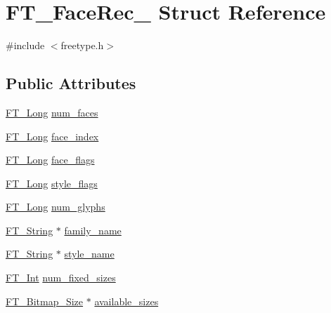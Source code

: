 \hypertarget{struct_f_t___face_rec__}{}\section{F\+T\+\_\+\+Face\+Rec\+\_\+ Struct Reference}
\label{struct_f_t___face_rec__}


{\ttfamily \#include $<$freetype.\+h$>$}

\subsection*{Public Attributes}
\begin{DoxyCompactItemize}
\item 
\mbox{\hyperlink{fttypes_8h_a7fa72a1f0e79fb1860c5965789024d6f}{F\+T\+\_\+\+Long}} \mbox{\hyperlink{struct_f_t___face_rec___af28be4cba102baaeb09d8e24b71e88fe}{num\+\_\+faces}}
\item 
\mbox{\hyperlink{fttypes_8h_a7fa72a1f0e79fb1860c5965789024d6f}{F\+T\+\_\+\+Long}} \mbox{\hyperlink{struct_f_t___face_rec___ab9a5640eb25bd3c743b3d725edd68a87}{face\+\_\+index}}
\item 
\mbox{\hyperlink{fttypes_8h_a7fa72a1f0e79fb1860c5965789024d6f}{F\+T\+\_\+\+Long}} \mbox{\hyperlink{struct_f_t___face_rec___af1596857ebc9f8eac4c4b51c8f3ffd31}{face\+\_\+flags}}
\item 
\mbox{\hyperlink{fttypes_8h_a7fa72a1f0e79fb1860c5965789024d6f}{F\+T\+\_\+\+Long}} \mbox{\hyperlink{struct_f_t___face_rec___ab06fc56f19fc1bf51cbed9bd621d3835}{style\+\_\+flags}}
\item 
\mbox{\hyperlink{fttypes_8h_a7fa72a1f0e79fb1860c5965789024d6f}{F\+T\+\_\+\+Long}} \mbox{\hyperlink{struct_f_t___face_rec___a58348bc3e0e113e8c73de9c318a9bd7a}{num\+\_\+glyphs}}
\item 
\mbox{\hyperlink{fttypes_8h_a9846214585359eb2ba6bbb0e6de30639}{F\+T\+\_\+\+String}} $\ast$ \mbox{\hyperlink{struct_f_t___face_rec___ae07b64a64466aa7ae2b9066e9336ac8b}{family\+\_\+name}}
\item 
\mbox{\hyperlink{fttypes_8h_a9846214585359eb2ba6bbb0e6de30639}{F\+T\+\_\+\+String}} $\ast$ \mbox{\hyperlink{struct_f_t___face_rec___abd855b9e48b1f377b22176fb97668d7b}{style\+\_\+name}}
\item 
\mbox{\hyperlink{fttypes_8h_af90e5fb0d07e21be9fe6faa33f02484c}{F\+T\+\_\+\+Int}} \mbox{\hyperlink{struct_f_t___face_rec___aa652af958546eb8edf87ccd4b697bfdf}{num\+\_\+fixed\+\_\+sizes}}
\item 
\mbox{\hyperlink{freetype_8h_a6905fdea05db62fabe3ed448cbf6778b}{F\+T\+\_\+\+Bitmap\+\_\+\+Size}} $\ast$ \mbox{\hyperlink{struct_f_t___face_rec___a563ca9007f754aa0f711ba67050f3e47}{available\+\_\+sizes}}

\end{DoxyCompactItemize}
